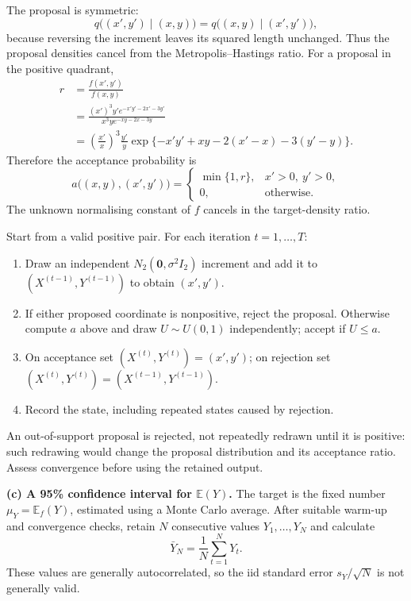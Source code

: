 \documentclass[11pt,a4paper]{article}
\newcommand{\E}{\mathbb{E}}
\begin{document}
The proposal is symmetric:
\[
q\bigl((x',y')\mid(x,y)\bigr)
=q\bigl((x,y)\mid(x',y')\bigr),
\]
because reversing the increment leaves its squared length unchanged.
Thus the proposal densities cancel from the Metropolis--Hastings ratio.
For a proposal in the positive quadrant,
\[
\begin{aligned}
r&=\frac{f(x',y')}{f(x,y)}\\
&=\frac{(x')^3y' e^{-x'y'-2x'-3y'}}{x^3y e^{-xy-2x-3y}}\\
&=\left(\frac{x'}x\right)^3\frac{y'}y
\exp\{-x'y'+xy-2(x'-x)-3(y'-y)\}.
\end{aligned}
\]
Therefore the acceptance probability is
\[
\boxed{
a\bigl((x,y),(x',y')\bigr)=
\begin{cases}
\min\{1,r\},&x'>0,\ y'>0,\\
0,&\text{otherwise}.
\end{cases}}
\]
The unknown normalising constant of $f$ cancels in the target-density ratio.

Start from a valid positive pair. For each iteration $t=1,\ldots,T$:
\begin{enumerate}[label=\arabic*.]
  \item Draw an independent $N_2(\mathbf0,\sigma^2I_2)$ increment and
        add it to $(X^{(t-1)},Y^{(t-1)})$ to obtain $(x',y')$.
  \item If either proposed coordinate is nonpositive, reject the proposal.
        Otherwise compute $a$ above and draw $U\sim U(0,1)$ independently;
        accept if $U\leq a$.
  \item On acceptance set $(X^{(t)},Y^{(t)})=(x',y')$; on rejection set
        $(X^{(t)},Y^{(t)})=(X^{(t-1)},Y^{(t-1)})$.
  \item Record the state, including repeated states caused by rejection.
\end{enumerate}
An out-of-support proposal is rejected, not repeatedly redrawn until it is
positive: such redrawing would change the proposal distribution and its
acceptance ratio. Assess convergence before using the retained output.

\textbf{(c) A 95\% confidence interval for $\E(Y)$.}
The target is the fixed number $\mu_Y=\E_f(Y)$, estimated using a Monte
Carlo average. After suitable warm-up and convergence checks, retain
$N$ consecutive values $Y_1,\ldots,Y_N$ and calculate
\[
\bar Y_N=\frac1N\sum_{t=1}^{N}Y_t.
\]
These values are generally autocorrelated, so the iid standard error
$s_Y/\sqrt N$ is not generally valid.
\end{document}
